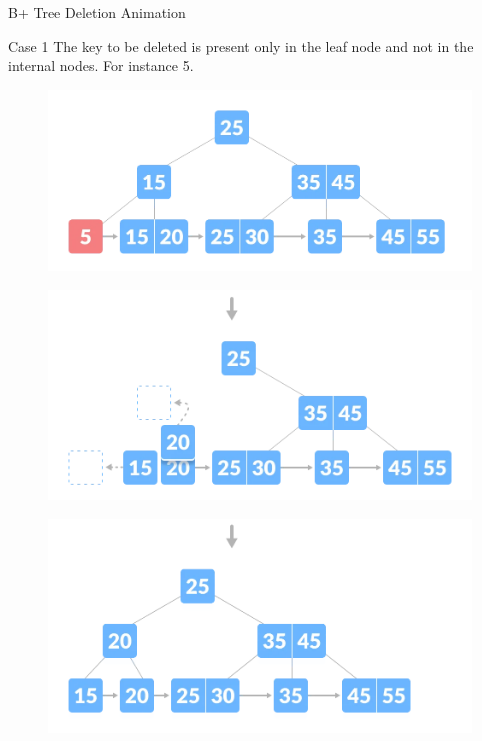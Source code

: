 \documentclass{beamer}
\begin{document}
\begin{frame}{B+ Tree Deletion Animation}
    \begin{table}[h]
        \centering
        \begin{overprint}
        \begin{block}{Case 1}
              The key to be deleted is present only in the leaf node and not in the internal nodes. For instance 5.
        \end{block}
            
        \begin{figure}
            \centering
             \includegraphics[scale=0.4]{Images/deletion-1.1.png}
        \end{figure}
        \begin{figure}
            \centering
             \includegraphics[scale=0.4]{Images/deletion-1.2.png}
        \end{figure}
        \begin{figure}
            \centering
             \includegraphics[scale=0.4]{Images/deletion-1.3.png}

\end{figure}
\end{overprint}
\end{table}
\end{frame}
\end{document}
